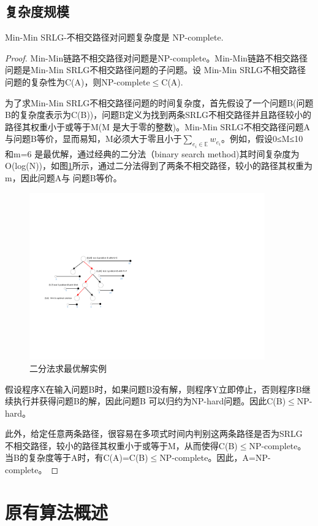 \subsection{复杂度规模}
\begin{theorem}
\label{le:lemma1}
    Min-Min SRLG-不相交路径对问题复杂度是 NP-complete.
\end{theorem}
\begin{proof}
Min-Min链路不相交路径对问题是NP-complete\cite{bhatia2006finding}。Min-Min链路不相交路径问题是Min-Min SRLG不相交路径问题的子问题。设
Min-Min SRLG不相交路径问题的复杂性为C(A)，则NP-complete$\leq$C(A).

为了求Min-Min SRLG不相交路径问题的时间复杂度，首先假设了一个问题B(问题B的复杂度表示为C(B))，问题B定义为找到两条SRLG不相交路径并且路径较小的路径其权重小于或等于M(M 是大于零的整数)。Min-Min SRLG不相交路径问题A 与问题B等价，显而易知，M必须大于零且小于$\sum\limits_{e_i\in \mathbb{E}}w_{e_i}$。例如，假设0≤M≤10 和m=6 是最优解，通过经典的二分法（binary search method)其时间复杂度为O(log(N))，如图\ref{fig:binarySearch}所示，通过二分法得到了两条不相交路径，较小的路径其权重为m，因此问题A与 问题B等价。
\begin{figure}[htbp]
  \centering
  \includegraphics[width=4.0in]{figures/binarySearch}
  \caption{二分法求最优解实例}
  \label{fig:binarySearch}
\end{figure}
假设程序X在输入问题B时，如果问题B没有解，则程序Y立即停止，否则程序B继续执行并获得问题B的解，因此问题B 可以归约为NP-hard问题。因此C(B)$\leq$NP-hard。

此外，给定任意两条路径，很容易在多项式时间内判别这两条路径是否为SRLG 不相交路径，较小的路径其权重小于或等于M，从而使得C(B)$\leq$NP-complete。 当B的复杂度等于A时，有C(A)=C(B)$\leq$NP-complete。因此，A=NP-complete。
\end{proof}
\section{原有算法概述}

